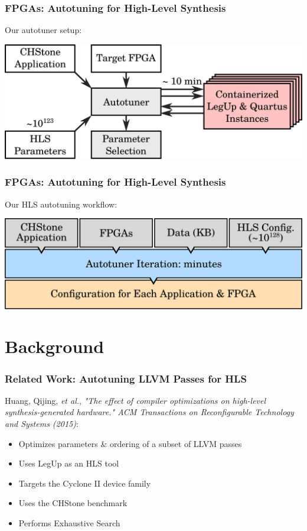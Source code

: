\documentclass[10pt, compress, xcolor={table,xcdraw,usenames}, aspectratio=169]{beamer}
\begin{document}
\begin{frame}
    \frametitle{FPGAs: Autotuning for High-Level Synthesis}
    \begin{block}{Our \alert{autotuner setup}:}
    \begin{center}
        \includegraphics[width=.65\textwidth]{fpga_docker_tuner}
    \end{center}
    \end{block}
\end{frame}

\begin{frame}
    \frametitle{FPGAs: Autotuning for High-Level Synthesis}
    \begin{block}{Our HLS \alert{autotuning workflow}:}
    \begin{center}
        \includegraphics[width=.65\textwidth]{overview_fpgas_small}
    \end{center}
    \end{block}
\end{frame}

\section{Background}

\begin{frame}
    \frametitle{Related Work: Autotuning LLVM Passes for HLS}
        \alert{Huang, Qijing, \emph{et al.}}, \emph{"The effect of compiler
        optimizations on high-level synthesis-generated hardware." ACM
        Transactions on Reconfigurable Technology and Systems (2015)}:

    \begin{itemize}
        \item Optimizes \alert{parameters \& ordering} of a \alert{subset of
            LLVM passes}
        \item Uses \alert{LegUp} as an HLS tool
        \item Targets the \alert{Cyclone II} device family
        \item Uses the \alert{CHStone benchmark}
        \item Performs \alert{Exhaustive Search}
    \end{itemize}
\end{frame}
\end{document}
